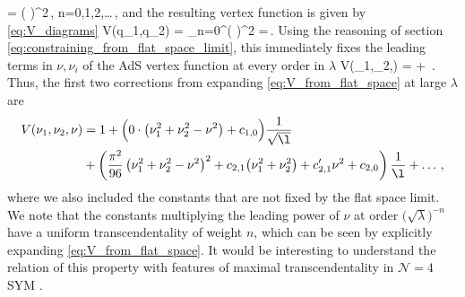 		= \left(  \right)^2\,, \qquad n=0,1,2,\ldots\,,
		\label{eq:3pt_A_calculated}
	\eeq
and the resulting vertex function is given by \eqref{eq:V_diagrams}
\beq
V(q_1,q_2) = 
\sum\limits_{n=0}^\infty \left(  \right)^2
=\,.
\label{eq:V_flat}
\eeq
Using the reasoning of section \ref{eq:constraining_from_flat_space_limit}, this immediately fixes the leading terms in $\nu, \nu_i$ of the AdS vertex function at every order in $\lambda$
	\beq
		V(\nu_1,\nu_2,\nu) = 
		+ \,.
		\label{eq:V_from_flat_space}
	\eeq
Thus, the first two corrections from expanding \eqref{eq:V_from_flat_space} at large $\lambda$ are
	\begin{align}
V(\nu_1,\nu_2,\nu) &= 1+\Big(0\cdot\big( \nu_1^2+\nu_2^2-\nu^2 \big) + c_{1,0}\Big) \frac{1}{\sqrt{\l}} 
\label{eq:V_polynomial}\\
&+\left( \frac{\pi^2}{96} \left( \nu_1^2+\nu_2^2-\nu^2 \right)^2 +c_{2,1} \big(\nu_1^2  + \nu_2^2\big)  + c'_{2,1} \nu^2 + c_{2,0} \right) \frac{1}{\l} + \ldots\,,
		\nonumber
	\end{align}
where we also included the constants  that are not fixed by the flat space limit. We note that the constants multiplying the leading power of $\nu$ at order $\big(\sqrt{\lambda}\big)^{-n}$ have a uniform transcendentality of weight $n$, which can be seen by explicitly expanding \eqref{eq:V_from_flat_space}. It would be interesting to understand the relation of this property with features of maximal transcendentality in $\mathcal{N}=4$ SYM \cite{Kotikov:2002ab,Kotikov:2007cy}.


